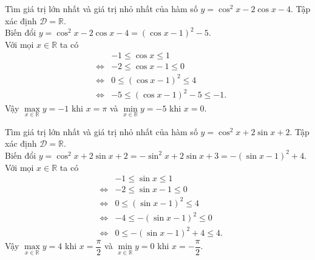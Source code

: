 \begin{bt}%
	Tìm giá trị lớn nhất và giá trị nhỏ nhất của hàm số  $y=\cos ^{2} x-2 \cos x-4$.
	\loigiai
	{
		Tập xác định $\mathscr{D}=\mathbb{R}$.\\
		Biến đổi $y=\cos ^{2} x-2 \cos x-4=\left(\cos x-1\right)^2-5$.\\
		Với mọi $x\in \mathbb{R}$ ta có
		\allowdisplaybreaks
		\begin{eqnarray*}
			& & -1\leq \cos x\leq 1\\
			&\Leftrightarrow& -2\leq \cos x-1\leq 0\\
			&\Leftrightarrow&0\leq \left( \cos x-1\right)^2\leq 4\\
			&\Leftrightarrow&-5\leq \left( \cos x-1\right)^2-5\leq -1.
		\end{eqnarray*}
		Vậy $\max\limits_{x \in \mathbb{R}} y=-1$ khi $x=\pi$ và $\min\limits_{x \in \mathbb{R}} y=-5$ khi $x=0$.
	}
\end{bt}
\begin{bt}%
	Tìm giá trị lớn nhất và giá trị nhỏ nhất của hàm số  $y=\cos ^{2} x+2 \sin x+2$.
	\loigiai
	{
		Tập xác định $\mathscr{D}=\mathbb{R}$.\\
		Biến đổi $y=\cos ^{2} x+2 \sin x+2=-\sin^2 x+2\sin x+3=-\left(\sin x-1\right)^2+4 $.\\
		Với mọi $x\in \mathbb{R}$ ta có
		\allowdisplaybreaks
		\begin{eqnarray*}
			& & -1\leq \sin x\leq 1\\
			&\Leftrightarrow& -2\leq \sin x-1\leq 0\\
			&\Leftrightarrow&0\leq \left( \sin x-1\right)^2\leq 4\\
			&\Leftrightarrow&-4\leq -\left( \sin x-1\right)^2\leq 0\\
			&\Leftrightarrow&0\leq -\left( \sin x-1\right)^2+4\leq 4.
		\end{eqnarray*}
		Vậy $\max\limits_{x \in \mathbb{R}} y=4$ khi $x=\dfrac{\pi}{2}$ và $\min\limits_{x \in \mathbb{R}} y=0$ khi $x=-\dfrac{\pi}{2}$.
	}
\end{bt}

